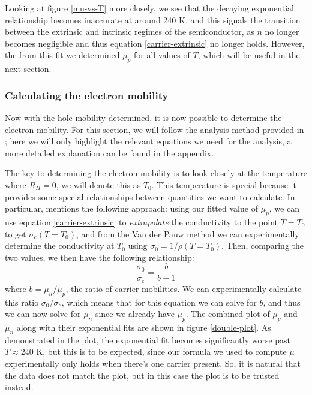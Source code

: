 \documentclass[10pt]{article}
\begin{document}
	Looking at figure \ref{mu-vs-T} more closely, we see that the decaying exponential relationship becomes
	inaccurate at around 240 K, and this signals the transition between the extrinsic and intrinsic regimes
	of the semiconductor, as \( n \) no longer becomes negligible and thus equation \ref{carrier-extrinsic}
	no longer holds. However, the from this fit we determined \( \mu_p \) for all values of \( T \), which
	will be useful in the next section.  

	\subsubsection{Calculating the electron mobility}
	Now with the hole mobility determined, it is now possible to determine the electron mobility. For this
	section, we will follow the analysis method provided in \cite{melissinos}; here we will only highlight the relevant
	equations we need for the analysis, a more detailed explanation can be found in the appendix.

	The key to determining the electron mobility is to look closely at the temperature where \( R_H = 0 \),
	we will denote this as \( T_0 \). This temperature is special because it provides some special
	relationships between quantities we want to calculate. In particular, \cite{melissinos} mentions the following
	approach: using our fitted value of \( \mu_p \), we can use equation \ref{carrier-extrinsic} to
	\textit{extrapolate} the conductivity to the point \( T = T_0 \) to get \( \sigma_e(T = T_0) \), 
	and from the Van der Pauw method we can
	experimentally determine the conductivity at \( T_0 \) using 
	\( \sigma_0 = 1 / \rho(T = T_0)\). Then, comparing the two values,
	we then have the following relationship:
	\begin{equation}
		\label{sigma}
		\frac{\sigma_0}{\sigma_e} = \frac{b}{b - 1}
	\end{equation}
	where \( b = \mu_n / \mu_p \), the ratio of carrier mobilities. We can experimentally calculate this
	ratio \( \sigma_0 / \sigma_e \), which means that for this equation we can solve for \( b \), and thus we
	can now solve for \( \mu_n \) since we already have \( \mu_p \). The combined plot of \( \mu_p \) and \(
	\mu_n\) along with their exponential fits are shown in figure \ref{double-plot}. As demonstrated in the
	plot, the exponential fit becomes significantly worse past \( T \approx 240 \) K, but this is to be
	expected, since our formula we used to compute \( \mu \) experimentally only holds when there's 
	one carrier present. So,
	it is natural that the data does not match the plot, but in this case the plot is to be trusted instead.
\end{document}
